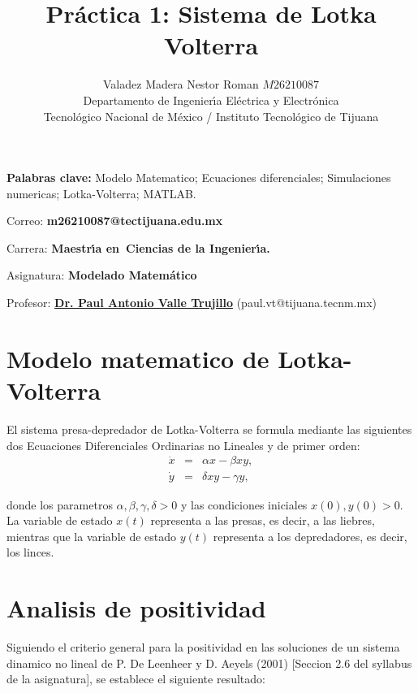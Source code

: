 \documentclass[letterpaper,11pt]{article}
\begin{document}
\title{Pr\'{a}ctica 1: Sistema de Lotka Volterra}
\author{Valadez Madera Nestor Roman $M26210087$ \\
Departamento de Ingenier\'{\i}a El\'{e}ctrica y Electr\'{o}nica\\
Tecnol\'{o}gico Nacional de M\'{e}xico / Instituto Tecnol\'{o}gico de Tijuana%
}
\maketitle

\noindent \textbf{Palabras clave: }Modelo Matematico; Ecuaciones
diferenciales; Simulaciones numericas; Lotka-Volterra; MATLAB.

\bigskip

\noindent Correo: \textbf{m26210087@tectijuana.edu.mx}

\noindent \noindent Carrera: \textbf{Maestr\'{\i}a en\ Ciencias de la
Ingenier\'{\i}a.}

\noindent Asignatura: \textbf{Modelado Matem\'{a}tico}

\noindent Profesor: \href{https://biomath.xyz/}{\textbf{Dr. Paul Antonio
Valle Trujillo}} (paul.vt@tijuana.tecnm.mx)

\bigskip

\section{Modelo matematico de Lotka-Volterra}

El sistema presa-depredador de Lotka-Volterra se formula mediante las
siguientes dos Ecuaciones Diferenciales Ordinarias no Lineales y de primer
orden:%
\begin{eqnarray*}
\dot{x} &=&\alpha x-\beta xy, \\
\dot{y} &=&\delta xy-\gamma y,
\end{eqnarray*}

donde los parametros $\alpha ,\beta ,\gamma ,\delta >0$ y las condiciones
iniciales $x(0),y(0)>0$. La variable de estado $x(t)$ representa a las
presas, es decir, a las liebres, mientras que la variable de estado $y(t)$
representa a los depredadores, es decir, los linces.

\bigskip

\section{Analisis de positividad}

Siguiendo el criterio general para la positividad en las soluciones de un
sistema dinamico no lineal de P. De Leenheer y D. Aeyels (2001) [Seccion 2.6
del syllabus de la asignatura], se establece el siguiente resultado:
\end{document}
